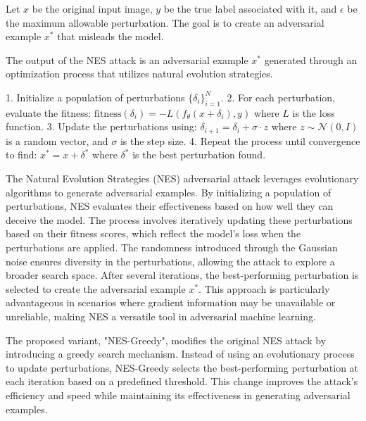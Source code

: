 Let $x$ be the original input image, $y$ be the true label associated with it, and $\epsilon$ be the maximum allowable perturbation. The goal is to create an adversarial example $x^*$ that misleads the model.

The output of the NES attack is an adversarial example $x^*$ generated through an optimization process that utilizes natural evolution strategies.

1. Initialize a population of perturbations $\{\delta_i\}_{i=1}^N$.
2. For each perturbation, evaluate the fitness:
   $\text{fitness}(\delta_i) = -L(f_\theta(x + \delta_i), y)$
   where $L$ is the loss function.
3. Update the perturbations using:
   $\delta_{i+1} = \delta_i + \sigma \cdot z$
   where $z \sim \mathcal{N}(0, I)$ is a random vector, and $\sigma$ is the step size.
4. Repeat the process until convergence to find:
   $x^* = x + \delta^*$
   where $\delta^*$ is the best perturbation found.

The Natural Evolution Strategies (NES) adversarial attack leverages evolutionary algorithms to generate adversarial examples. By initializing a population of perturbations, NES evaluates their effectiveness based on how well they can deceive the model. The process involves iteratively updating these perturbations based on their fitness scores, which reflect the model's loss when the perturbations are applied. The randomness introduced through the Gaussian noise ensures diversity in the perturbations, allowing the attack to explore a broader search space. After several iterations, the best-performing perturbation is selected to create the adversarial example $x^*$. This approach is particularly advantageous in scenarios where gradient information may be unavailable or unreliable, making NES a versatile tool in adversarial machine learning.

The proposed variant, "NES-Greedy", modifies the original NES attack by introducing a greedy search mechanism. Instead of using an evolutionary process to update perturbations, NES-Greedy selects the best-performing perturbation at each iteration based on a predefined threshold. This change improves the attack's efficiency and speed while maintaining its effectiveness in generating adversarial examples.